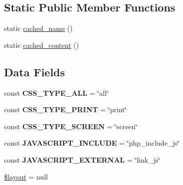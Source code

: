 \subsection*{Static Public Member Functions}
\begin{DoxyCompactItemize}
\item 
static \hyperlink{class_output_a1e3072c550f01769a7c02ff9b274c523}{cached\_\-name} ()
\item 
static \hyperlink{class_output_a86aefe67306dd6ca5cde3ea1629c4529}{cached\_\-content} ()
\end{DoxyCompactItemize}
\subsection*{Data Fields}
\begin{DoxyCompactItemize}
\item 
\hypertarget{class_output_a0b870f5a2f1da8094cbb4c1228e05813}{
const {\bfseries CSS\_\-TYPE\_\-ALL} = \char`\"{}all\char`\"{}}
\label{class_output_a0b870f5a2f1da8094cbb4c1228e05813}

\item 
\hypertarget{class_output_a7e4268930b42345ff8531a61456e470a}{
const {\bfseries CSS\_\-TYPE\_\-PRINT} = \char`\"{}print\char`\"{}}
\label{class_output_a7e4268930b42345ff8531a61456e470a}

\item 
\hypertarget{class_output_a8a34ca8ad339f9e5b2c7c7987384a7a6}{
const {\bfseries CSS\_\-TYPE\_\-SCREEN} = \char`\"{}screen\char`\"{}}
\label{class_output_a8a34ca8ad339f9e5b2c7c7987384a7a6}

\item 
\hypertarget{class_output_a4fb2f4861f8cbc4c0570a4136192d4ba}{
const {\bfseries JAVASCRIPT\_\-INCLUDE} = \char`\"{}php\_\-include\_\-js\char`\"{}}
\label{class_output_a4fb2f4861f8cbc4c0570a4136192d4ba}

\item 
\hypertarget{class_output_aecd7927737b024065994889ea07c8563}{
const {\bfseries JAVASCRIPT\_\-EXTERNAL} = \char`\"{}link\_\-js\char`\"{}}
\label{class_output_aecd7927737b024065994889ea07c8563}

\item 
\hyperlink{class_output_a2b0d08e73a90b9443ce37506b7c6a544}{\$layout} = null
\end{DoxyCompactItemize}
